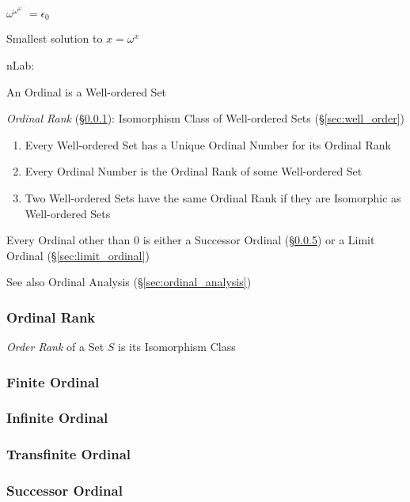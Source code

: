 $\omega^{\omega^{\omega^{\cdots}}} = \epsilon_0$

Smallest solution to $x = \omega^x$

nLab:

An Ordinal is a Well-ordered Set

\emph{Ordinal Rank} (\S\ref{sec:ordinal_rank}): Isomorphism Class of
Well-ordered Sets (\S\ref{sec:well_order})

\begin{enumerate}
  \item Every Well-ordered Set has a Unique Ordinal Number for its
    Ordinal Rank
  \item Every Ordinal Number is the Ordinal Rank of some Well-ordered
    Set
  \item Two Well-ordered Sets have the same Ordinal Rank if they are
    Isomorphic as Well-ordered Sets
\end{enumerate}

Every Ordinal other than $0$ is either a Successor Ordinal
(\S\ref{sec:successor_ordinal}) or a Limit Ordinal
(\S\ref{sec:limit_ordinal})


\fist See also Ordinal Analysis (\S\ref{sec:ordinal_analysis})



\subsubsection{Ordinal Rank}\label{sec:ordinal_rank}

\emph{Order Rank} of a Set $S$ is its Isomorphism Class



\subsubsection{Finite Ordinal}\label{sec:finite_ordinal}

\subsubsection{Infinite Ordinal}\label{sec:infinite_ordinal}

\subsubsection{Transfinite Ordinal}\label{sec:transfinite_ordinal}

\subsubsection{Successor Ordinal}\label{sec:successor_ordinal}

